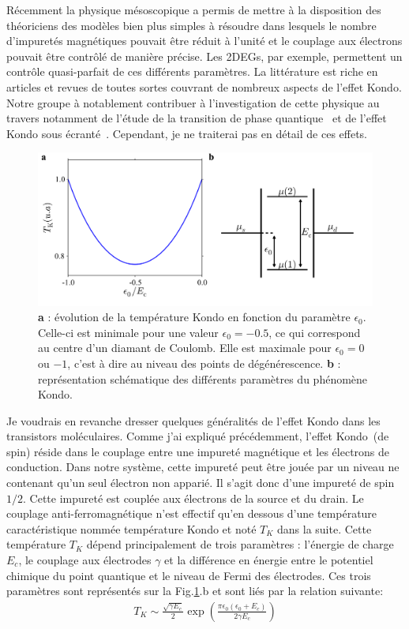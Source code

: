 Récemment la physique mésoscopique a permis de mettre à la disposition des théoriciens des modèles bien plus simples à résoudre dans lesquels le nombre d'impuretés magnétiques pouvait être réduit à l'unité et le couplage aux électrons pouvait être contrôlé de manière précise. Les 2DEGs, par exemple, permettent un contrôle quasi-parfait de ces différents paramètres. La littérature est riche en articles et revues de toutes sortes couvrant de nombreux aspects de l'effet Kondo. Notre groupe à notablement contribuer à l'investigation de cette physique au travers notamment de l'étude de la transition de phase quantique~\cite{Roch2008} et de l'effet Kondo sous écranté~\cite{Roch2009}. Cependant, je ne traiterai pas en détail de ces effets.

\begin{figure}
\includegraphics[scale=0.5]{Theorie/Transport/figure6/figure6.pdf} 
\caption{\textbf{a} : évolution de la température Kondo en fonction du paramètre $\epsilon_0$. Celle-ci est minimale pour une valeur $\epsilon_0=-0.5$, ce qui correspond au centre d'un diamant de Coulomb. Elle est maximale pour $\epsilon_0=0$ ou $-1$, c'est à dire au niveau des points de dégénérescence. \textbf{b} : représentation schématique des différents paramètres du phénomène Kondo.}
\label{Kondo_param}
\end{figure}


Je voudrais en revanche dresser quelques généralités de l'effet Kondo dans les transistors moléculaires. Comme j'ai expliqué précédemment, l'effet Kondo~(de spin) réside dans le couplage entre une impureté magnétique et les électrons de conduction. Dans notre système, cette impureté peut être jouée par un niveau ne contenant qu'un seul électron non apparié. Il s'agit donc d'une impureté de spin $1/2$. Cette impureté est couplée aux électrons de la source et du drain. Le couplage anti-ferromagnétique n'est effectif qu'en dessous d'une température caractéristique nommée température Kondo et noté $T_K$ dans la suite. Cette température $T_K$ dépend principalement de trois paramètres : l'énergie de charge $E_c$, le couplage aux électrodes $\gamma$ et la différence en énergie entre le potentiel chimique du point quantique et le niveau de Fermi des électrodes. Ces trois paramètres sont représentés sur la Fig.\ref{Kondo_param}.b et sont liés par la relation suivante:
\begin{eqnarray}
T_K \sim \frac{\sqrt{\gamma E_c}}{2} \exp(\frac{\pi \epsilon_0(\epsilon_0 + E_c)}{2\gamma E_c})
\end{eqnarray}

